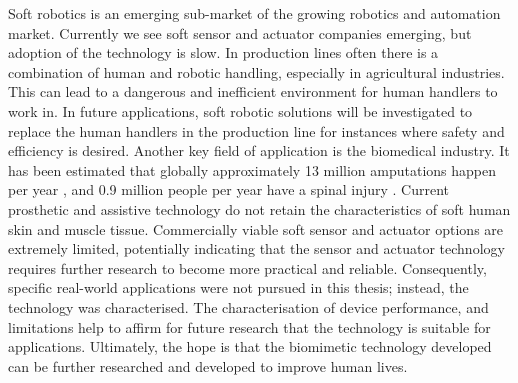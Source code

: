 Soft robotics is an emerging sub-market of the growing robotics and automation market. Currently we see soft sensor and actuator companies emerging, but adoption of the technology is slow. In production lines often there is a combination of human and robotic handling, especially in agricultural industries. This can lead to a dangerous and inefficient environment for human handlers to work in. In future applications, soft robotic solutions will be investigated to replace the human handlers in the production line for instances where safety and efficiency is desired. Another key field of application is the biomedical industry. It has been estimated that globally approximately 13 million amputations happen per year \cite{Yuan2023a}, and 0.9 million people per year have a spinal injury \cite{Ding2022}. Current prosthetic and assistive technology do not retain the characteristics of soft human skin and muscle tissue. Commercially viable soft sensor and actuator options are extremely limited, potentially indicating that the sensor and actuator technology requires further research to become more practical and reliable. Consequently, specific real-world applications were not pursued in this thesis; instead, the technology was characterised. The characterisation of device performance, and limitations help to affirm for future research that the technology is suitable for applications. Ultimately, the hope is that the biomimetic technology developed can be further researched and developed to improve human lives.



